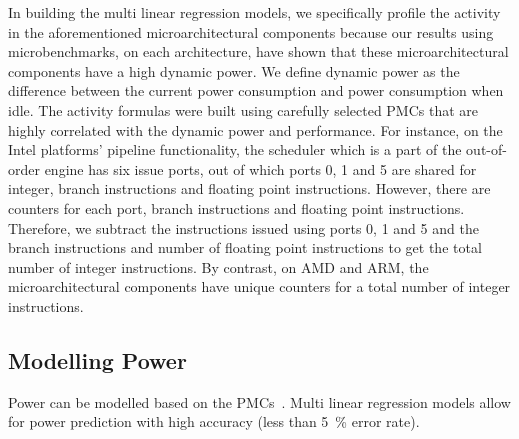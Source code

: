  In building the multi linear regression models, we specifically profile the
activity in the aforementioned microarchitectural components because our results using
microbenchmarks, on each architecture, have shown that these microarchitectural components
have a high dynamic power. We define dynamic power as the difference between the current
power consumption and power consumption when idle. The activity formulas were built using
carefully selected PMCs that are highly correlated with the dynamic power and performance.
For instance, on the Intel platforms' pipeline functionality, the scheduler which is a
part of the out-of-order engine has six issue ports, out of which ports 0, 1 and 5 are
shared for integer, branch instructions and floating point instructions.  However, there
are counters for each port, branch instructions and floating point instructions.
Therefore, we subtract the instructions issued using ports 0, 1 and 5 and the branch
instructions and number of floating point instructions to get the total number of integer
instructions. By contrast, on AMD and ARM, the microarchitectural components have unique
counters for a total number of integer instructions.




\newpage

\subsection{Modelling Power}
\label{subsec: model power}

Power can be modelled based on the PMCs~\citep{Bellosa:2000:BED:566726.566736,
Lewis:2010:CAP:1924920.1924929,Isci:2003:RPM:956417.956567,
Bertran:2013:CPM:2479391.2479401, Bertran:2012:SEC:2457472.2457499,
Bertran:2012:EAS:2039447.2039649}.  Multi linear regression models allow for power
prediction with high accuracy (less than \SI{5}{\percent} error rate). 


 
